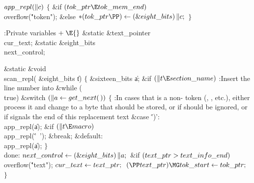 \Y\B\4\D$\\{app\_repl}(\|c)$ \6
${}\{{}$\1\6
\&{if} ${}(\\{tok\_ptr}\E\\{tok\_mem\_end}){}$\1\5
\\{overflow}(\.{"token"});\2\6
\&{else}\1\5
${}{*}(\\{tok\_ptr}\PP)\K(\&{eight\_bits})\,\|c;{}$\2\6
\4${}\}{}$\2\par
\Y\B\4:Private variables\X${}\mathrel+\E{}$\6
\&{static} \&{text\_pointer} \\{cur\_text};\6
\&{static} \&{eight\_bits} \\{next\_control};\par
\fi

\B\1\1\&{static} \&{void} \\{scan\_repl}(%
\6
\&{eight\_bits} \|t)\2\2\6
${}\{{}$\1\6
\&{sixteen\_bits} \|a;\7
\&{if} ${}(\|t\E\\{section\_name}){}$\1\5
:Insert the line number into \X\2\6
\&{while} (\\{true})\1\6
\&{switch} ${}(\|a\leftarrow\\{get\_next}(\,)){}$\5
${}\{{}$\1\6
\hbox{\4}:In cases that  is a non- token (, , etc.), either process it and change %
 to a byte that should be stored, or  if 
should be ignored, or  if  signals the end of
this replacement text\X\6
\4\&{case} \.{')'}:\5
\\{app\_repl}(\|a);\6
\&{if} ${}(\|t\E\\{macro}){}$\1\5
\\{app\_repl}(\.{'\ '});\2\6
\&{break};\6
\4\&{default}:\5
\\{app\_repl}(\|a);\6
\4${}\}{}$\2\2\6
\4\\{done}:\5
${}\\{next\_control}\leftarrow(\&{eight\_bits})\,\|a;{}$\6
\&{if} ${}(\\{text\_ptr}>\\{text\_info\_end}){}$\1\5
\\{overflow}(\.{"text"});\2\6
${}\\{cur\_text}\leftarrow\\{text\_ptr};{}$\6
${}(\PP\\{text\_ptr})\MG\\{tok\_start}\K\\{tok\_ptr};{}$\6
\4${}\}{}$\2\par
\fi

